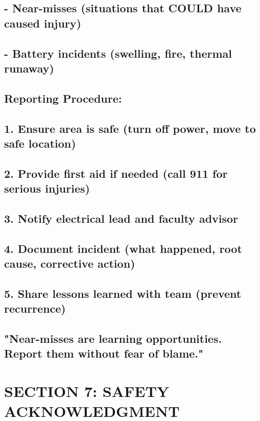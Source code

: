 \documentclass[11pt,letterpaper]{article}
\begin{document}
{{\subsection*{- Near-misses (situations that COULD have caused injury)}

\subsection*{- Battery incidents (swelling, fire, thermal runaway)}

\subsection*{Reporting Procedure:}

\subsection*{1. Ensure area is safe (turn off power, move to safe location)}

\subsection*{2. Provide first aid if needed (call 911 for serious injuries)}

\subsection*{3. Notify electrical lead and faculty advisor}

\subsection*{4. Document incident (what happened, root cause, corrective action)}

\subsection*{5. Share lessons learned with team (prevent recurrence)}

\subsection*{"Near-misses are learning opportunities. Report them without fear of blame."}

\section{SECTION 7: SAFETY ACKNOWLEDGMENT}

}}
\end{document}
